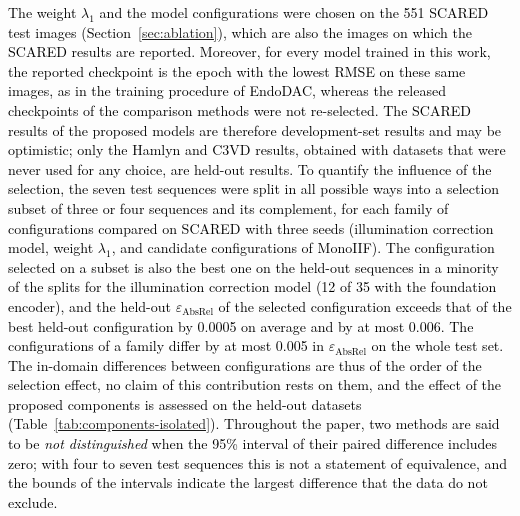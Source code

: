 \documentclass[a4paper,fleqn]{cas-dc}
\begin{document}
{\textcolor{black}{ The weight $\lambda_1$ and the model configurations were chosen on the 551 SCARED test images (Section~\ref{sec:ablation}), which are also the images on which the SCARED results are reported. Moreover, for every model trained in this work, the reported checkpoint is the epoch with the lowest RMSE on these same images, as in the training procedure of EndoDAC, whereas the released checkpoints of the comparison methods were not re-selected. The SCARED results of the proposed models are therefore development-set results and may be optimistic; only the Hamlyn and C3VD results, obtained with datasets that were never used for any choice, are held-out results. To quantify the influence of the selection, the seven test sequences were split in all possible ways into a selection subset of three or four sequences and its complement, for each family of configurations compared on SCARED with three seeds (illumination correction model, weight $\lambda_1$, and candidate configurations of MonoIIF). The configuration selected on a subset is also the best one on the held-out sequences in a minority of the splits for the illumination correction model (12 of 35 with the foundation encoder), and the held-out $\varepsilon_\textrm{AbsRel}$ of the selected configuration exceeds that of the best held-out configuration by 0.0005 on average and by at most 0.006. The configurations of a family differ by at most 0.005 in $\varepsilon_\textrm{AbsRel}$ on the whole test set. The in-domain differences between configurations are thus of the order of the selection effect, no claim of this contribution rests on them, and the effect of the proposed components is assessed on the held-out datasets (Table~\ref{tab:components-isolated}). Throughout the paper, two methods are said to be \emph{not distinguished} when the 95\% interval of their paired difference includes zero; with four to seven test sequences this is not a statement of equivalence, and the bounds of the intervals indicate the largest difference that the data do not exclude.}

}
\end{document}
